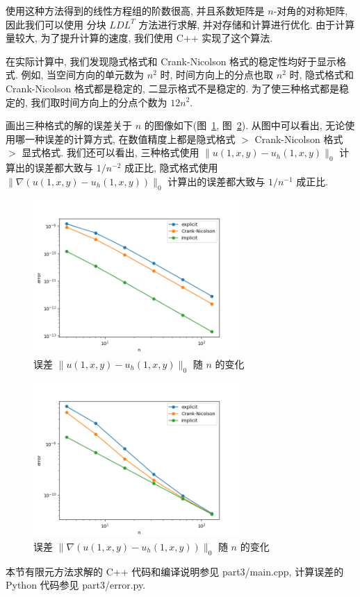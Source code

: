 \documentclass[UTF8]{article}
\begin{document}
    使用这种方法得到的线性方程组的阶数很高, 并且系数矩阵是 $n$-对角的对称矩阵, 因此我们可以使用 分块 $LDL^T$ 方法进行求解, 并对存储和计算进行优化.
    由于计算量较大, 为了提升计算的速度, 我们使用 C++ 实现了这个算法.

    在实际计算中, 我们发现隐式格式和 Crank-Nicolson 格式的稳定性均好于显示格式.
    例如, 当空间方向的单元数为 $n^2$ 时, 时间方向上的分点也取 $n^2$ 时, 隐式格式和 Crank-Nicolson 格式都是稳定的, 二显示格式不是稳定的.
    为了使三种格式都是稳定的, 我们取时间方向上的分点个数为 $12n^2$.

    画出三种格式的解的误差关于 $n$ 的图像如下(图~\ref{fig:figure5}, 图~\ref{fig:figure6}).
    从图中可以看出, 无论使用哪一种误差的计算方式, 在数值精度上都是隐式格式 $>$ Crank-Nicolson 格式 $>$ 显式格式.
    我们还可以看出, 三种格式使用 $\|u(1,x,y)-u_h(1,x,y)\|_0$ 计算出的误差都大致与 $1/n^{-2}$ 成正比, 隐式格式使用 $\|\nabla(u(1,x,y)-u_h(1,x,y))\|_0$ 计算出的误差都大致与 $1/n^{-1}$ 成正比.

    \begin{figure}[h]
        \centering
        \includegraphics[width=0.7\textwidth]{./assets/L2_error}
        \caption{误差 $\|u(1,x,y)-u_h(1,x,y)\|_0$ 随 $n$ 的变化}
        \label{fig:figure5}
    \end{figure}

    \begin{figure}[h]
        \centering
        \includegraphics[width=0.7\textwidth]{./assets/H1_error}
        \caption{误差 $\|\nabla(u(1,x,y)-u_h(1,x,y))\|_0$ 随 $n$ 的变化}
        \label{fig:figure6}
    \end{figure}

    本节有限元方法求解的 C++ 代码和编译说明参见 part3/main.cpp, 计算误差的 Python 代码参见 part3/error.py.
\end{document}
